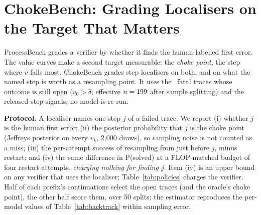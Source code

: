 \section{ChokeBench: Grading Localisers on the Target That Matters}\label{sec:chokebench}
ProcessBench grades a verifier by whether it finds the human-labelled first error. The value curves
make a second target measurable: the \emph{choke point}, the step where $v$ falls most. ChokeBench
grades step localisers on both, and on what the named step is worth as a resampling point. It uses
the \cbN\ fatal traces whose outcome is still open ($v_0>\delta$; effective $n=199$ after sample
splitting) and the released step signals; no model is re-run.

\textbf{Protocol.} A localiser names one step $j$ of a failed trace. We report (i) whether $j$ is
the human first error; (ii) the posterior probability that $j$ is the choke point (Jeffreys
posterior on every $v_k$, 2,000 draws), so sampling noise is not counted as a miss; (iii) the
per-attempt success of resampling from just before $j$, minus restart; and (iv) the same difference
in P(solved) at a FLOP-matched budget of four restart attempts, \emph{charging nothing for finding
$j$}. Item (iv) is an upper bound on any verifier that uses the localiser; Table~\ref{tab:policies}
charges the verifier. Half of each prefix's continuations select the open traces (and the oracle's
choke point), the other half score them, over 50 splits; the estimator reproduces the per-model
values of Table~\ref{tab:backtrack} within sampling error.

